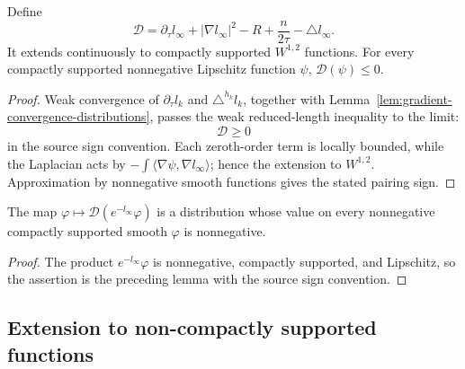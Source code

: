\begin{lemma}\label{lem:distribution-d-nonpositive}
Define
\[
 \mathcal D=\partial_\tau l_\infty+|\nabla l_\infty|^2-R
 +\frac n{2\tau}-\triangle l_\infty.
\]
It extends continuously to compactly supported $W^{1,2}$ functions.
For every compactly supported nonnegative Lipschitz function $\psi$,
$\mathcal D(\psi)\leq0$.
\end{lemma}
\begin{proof}
\sketch
{}
Weak convergence of $\partial_\tau l_k$ and $\triangle^{h_k}l_k$,
together with Lemma~\ref{lem:gradient-convergence-distributions},
passes the weak reduced-length inequality to the limit:
\begin{equation}\label{1stlinftyeqn}
 \mathcal D\geq0
\end{equation}
in the source sign convention. Each zeroth-order term is locally
bounded, while the Laplacian acts by
$-\int\langle\nabla\psi,\nabla l_\infty\rangle$; hence the extension
to $W^{1,2}$. Approximation by nonnegative smooth functions gives the
stated pairing sign.
\end{proof}

\begin{corollary}\label{cor:weighted-distribution-nonnegative}
\label{etimesdis}
The map $\varphi\mapsto\mathcal D(e^{-l_\infty}\varphi)$ is a
distribution whose value on every nonnegative compactly supported
smooth $\varphi$ is nonnegative.
\end{corollary}
\begin{proof}
\sketch
{}
The product $e^{-l_\infty}\varphi$ is nonnegative, compactly
supported, and Lipschitz, so the assertion is the preceding lemma
with the source sign convention.
\end{proof}

\subsection{Extension to non-compactly supported functions}

